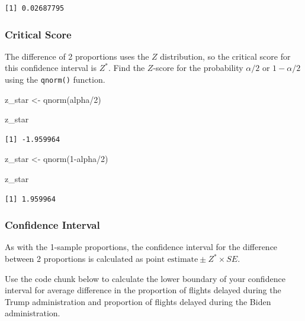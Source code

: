 \documentclass[
  letterpaper,
  DIV=11,
  numbers=noendperiod]{scrartcl}
\newenvironment{Shaded}{\begin{snugshade}}{\end{snugshade}}
\newcommand{\DecValTok}[1]{\textcolor[rgb]{0.68,0.00,0.00}{#1}}
\newcommand{\FunctionTok}[1]{\textcolor[rgb]{0.28,0.35,0.67}{#1}}
\newcommand{\NormalTok}[1]{\textcolor[rgb]{0.00,0.23,0.31}{#1}}
\newcommand{\OtherTok}[1]{\textcolor[rgb]{0.00,0.23,0.31}{#1}}
\newcommand{\SpecialCharTok}[1]{\textcolor[rgb]{0.37,0.37,0.37}{#1}}
\begin{document}
\begin{verbatim}
[1] 0.02687795
\end{verbatim}

\subsubsection{Critical Score}\label{critical-score}

The difference of 2 proportions uses the \(Z\) distribution, so the
critical score for this confidence interval is \(Z^*\). Find the
\(Z\)-score for the probability \(\alpha/2\) or \(1-\alpha/2\) using the
\texttt{qnorm()} function.

\begin{Shaded}
\begin{Highlighting}[]
\NormalTok{z\_star }\OtherTok{\textless{}{-}} \FunctionTok{qnorm}\NormalTok{(alpha}\SpecialCharTok{/}\DecValTok{2}\NormalTok{)}

\NormalTok{z\_star}
\end{Highlighting}
\end{Shaded}

\begin{verbatim}
[1] -1.959964
\end{verbatim}

\begin{Shaded}
\begin{Highlighting}[]
\NormalTok{z\_star }\OtherTok{\textless{}{-}} \FunctionTok{qnorm}\NormalTok{(}\DecValTok{1}\SpecialCharTok{{-}}\NormalTok{alpha}\SpecialCharTok{/}\DecValTok{2}\NormalTok{)}

\NormalTok{z\_star}
\end{Highlighting}
\end{Shaded}

\begin{verbatim}
[1] 1.959964
\end{verbatim}

\subsubsection{Confidence Interval}\label{confidence-interval-1}

As with the 1-sample proportions, the confidence interval for the
difference between 2 proportions is calculated as
\(\text{point estimate} \pm Z^* \times SE\).

Use the code chunk below to calculate the lower boundary of your
confidence interval for average difference in the proportion of flights
delayed during the Trump administration and proportion of flights
delayed during the Biden administration.
\end{document}
